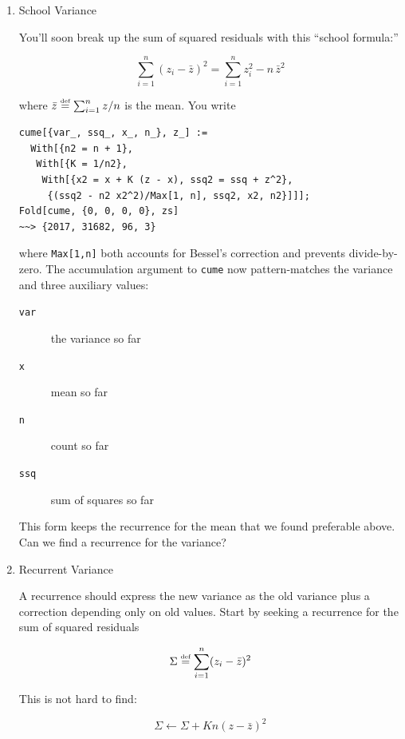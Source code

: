 \documentclass[10pt,oneside,x11names]{article}
\begin{document}
\begin{enumerate}
\item School Variance
\label{sec:orgheadline7}

You'll soon break up the sum of squared residuals with this ``school formula:''

\begin{equation*}
\sum_{i=1}^n{(z_i-\bar{z})^2}=\sum_{i=1}^n{z_i^2}-n\,\bar{z}^2
\end{equation*}

\noindent where \(\bar{z}\stackrel{\text{\tiny def}}{=} \sum_{i=1}^nz/n\) is the
mean. You write

\begin{verbatim}
cume[{var_, ssq_, x_, n_}, z_] :=
  With[{n2 = n + 1},
   With[{K = 1/n2},
    With[{x2 = x + K (z - x), ssq2 = ssq + z^2},
     {(ssq2 - n2 x2^2)/Max[1, n], ssq2, x2, n2}]]];
Fold[cume, {0, 0, 0, 0}, zs]
~~> {2017, 31682, 96, 3}
\end{verbatim}

\noindent where \texttt{Max[1,n]} both accounts for Bessel's correction and prevents
divide-by-zero. The accumulation argument to \texttt{cume} now pattern-matches the
variance and three auxiliary values:
\begin{description}
\item[{\texttt{var}}] the variance so far
\item[{\texttt{x}}] mean so far
\item[{\texttt{n} }] count so far
\item[{\texttt{ssq}}] sum of squares so far
\end{description}
This form keeps the recurrence for the mean that we found preferable above. Can
we find a recurrence for the variance?

\item Recurrent Variance
\label{sec:orgheadline8}

A recurrence should express the new variance as the old variance plus a
correction depending only on old values. Start by seeking a
recurrence for the sum of squared residuals 

\begin{equation*}
\Sigma\stackrel{\text{\tiny def}}{=}\sum_{i=1}^{n}(z_i-\bar{z})^2
\end{equation*}

\noindent This is not hard to find:

\begin{equation*}
\Sigma \leftarrow \Sigma + K n (z-\bar{z})^2
\end{equation*}


\end{enumerate}
\end{document}
